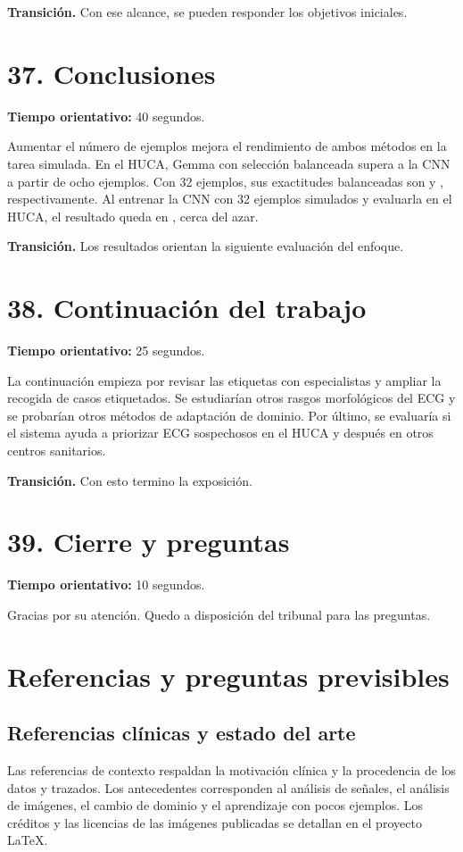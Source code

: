 \documentclass[11pt,a4paper]{article}
\begin{document}
\textbf{Transición.} Con ese alcance, se pueden responder los objetivos iniciales.

\section*{37. Conclusiones}
\textbf{Tiempo orientativo: }40 segundos.

Aumentar el número de ejemplos mejora el rendimiento de ambos métodos en la tarea simulada. En el HUCA, Gemma con selección balanceada supera a la CNN a partir de ocho ejemplos. Con 32 ejemplos, sus exactitudes balanceadas son \RealVlmBA{} y \RealCnnLastBA{}, respectivamente. Al entrenar la CNN con 32 ejemplos simulados y evaluarla en el HUCA, el resultado queda en \TransferCnnLastBA{}, cerca del azar.

\textbf{Transición.} Los resultados orientan la siguiente evaluación del enfoque.

\section*{38. Continuación del trabajo}
\textbf{Tiempo orientativo: }25 segundos.

La continuación empieza por revisar las etiquetas con especialistas y ampliar la recogida de casos etiquetados. Se estudiarían otros rasgos morfológicos del ECG y se probarían otros métodos de adaptación de dominio. Por último, se evaluaría si el sistema ayuda a priorizar ECG sospechosos en el HUCA y después en otros centros sanitarios.

\textbf{Transición.} Con esto termino la exposición.

\section*{39. Cierre y preguntas}
\textbf{Tiempo orientativo: }10 segundos.

Gracias por su atención. Quedo a disposición del tribunal para las preguntas.

\clearpage\section*{Referencias y preguntas previsibles}
\subsection*{Referencias clínicas y estado del arte}
Las referencias de contexto respaldan la motivación clínica y la procedencia de los datos y trazados. Los antecedentes corresponden al análisis de señales, el análisis de imágenes, el cambio de dominio y el aprendizaje con pocos ejemplos. Los créditos y las licencias de las imágenes publicadas se detallan en el proyecto LaTeX.
\end{document}
